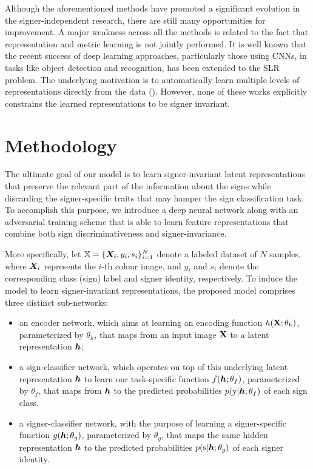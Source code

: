 Although the aforementioned methods have promoted a significant evolution in the signer-independent research, there are still many opportunities for improvement. A major weakness across all the methods is related to the fact that representation and metric learning is not jointly performed. It is well known that the recent success of deep learning approaches, particularly those using CNNs, in tasks like object detection and recognition, has been extended to the SLR problem. The underlying motivation is to automatically learn multiple levels of representations directly from the data (\citet{Pigou2015, Koller2016, Wu2016, Neverova2016, Kumar2017}). However, none of these works explicitly constrains the learned representations to be signer invariant.

\section{Methodology}
\label{sec:adv_signer_inv_methodology}

The ultimate goal of our model is to learn signer-invariant latent representations that preserve the relevant part of the information about the signs while discarding the signer-specific traits that may hamper the sign classification task. To accomplish this purpose, we introduce a deep neural network along with an adversarial training scheme that is able to learn feature representations that combine both sign discriminativeness and signer-invariance.

More specifically, let ${\mathbb{X}}=\{{\bm{X}}_{i},y_{i},s_{i}\}_{i=1}^{N}$ denote a labeled dataset of $N$ samples, where ${\bm{X}}_{i}$ represents the $i$-th colour image, and $y_{i}$ and $s_{i}$ denote the corresponding class (sign) label and signer identity, respectively. To induce the model to learn signer-invariant representations, the proposed model comprises three distinct sub-networks:
\begin{itemize}
    \item an encoder network, which aims at learning an encoding function $h({\mathbf{X}};\theta_h)$, parameterized by $\theta_h$, that maps from an input image ${\mathbf{X}}$ to a latent representation ${\bm{h}}$;
    \item a sign-classifier network, which operates on top of this underlying latent representation ${\bm{h}}$ to learn our task-specific function $f({\bm{h}}; \theta_f)$, parameterized by $\theta_f$, that maps from ${\bm{h}}$ to the predicted probabilities $p({\textnormal{y}}|{\bm{h}}; \theta_f)$ of each sign class.
    \item a signer-classifier network, with the purpose of learning a signer-specific function $g({\bm{h}}; \theta_g)$, parameterized by $\theta_g$, that maps the same hidden representation ${\bm{h}}$ to the predicted probabilities $p({\textnormal{s}}|{\bm{h}};\theta_g)$ of each signer identity.
\end{itemize}

